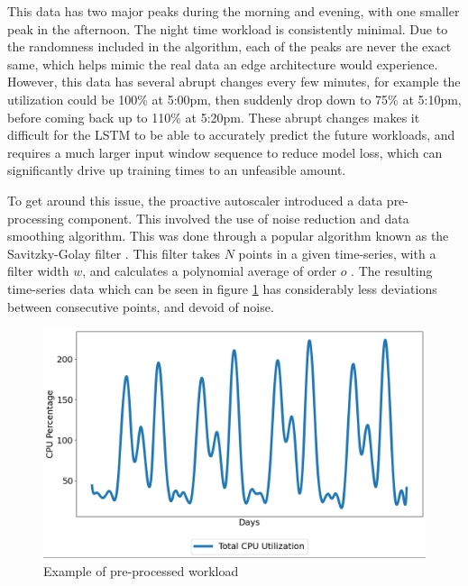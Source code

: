 This data has two major peaks during the morning and evening, with one smaller peak in the afternoon. The night time workload is consistently minimal. Due to the randomness included in the algorithm, each of the peaks are never the exact same, which helps mimic the real data an edge architecture would experience. However, this data has several abrupt changes every few minutes, for example the utilization could be 100\% at 5:00pm, then suddenly drop down to 75\% at 5:10pm, before coming back up to 110\% at 5:20pm. These abrupt changes makes it difficult for the LSTM to be able to accurately predict the future workloads, and requires a much larger input window sequence to reduce model loss, which can significantly drive up training times to an unfeasible amount.\par

To get around this issue, the proactive autoscaler introduced a data pre-processing component. This involved the use of noise reduction and data smoothing algorithm. This was done through a popular algorithm known as the Savitzky-Golay filter \cite{savitzky1964smoothing}. This filter takes $N$ points in a given time-series, with a filter width $w$, and calculates a polynomial average of order $o$ \cite{schafer2011savitzky}. The resulting time-series data which can be seen in figure \ref{fig:lstm-smooth-data} has considerably less deviations between consecutive points, and devoid of noise.\par

\begin{figure}[htb]
    \centering
    \caption{Example of pre-processed workload}
    \label{fig:lstm-smooth-data}
    \includegraphics[width=1.0\linewidth]{Figures/LSTM-Smooth-Data.png}
\end{figure}

